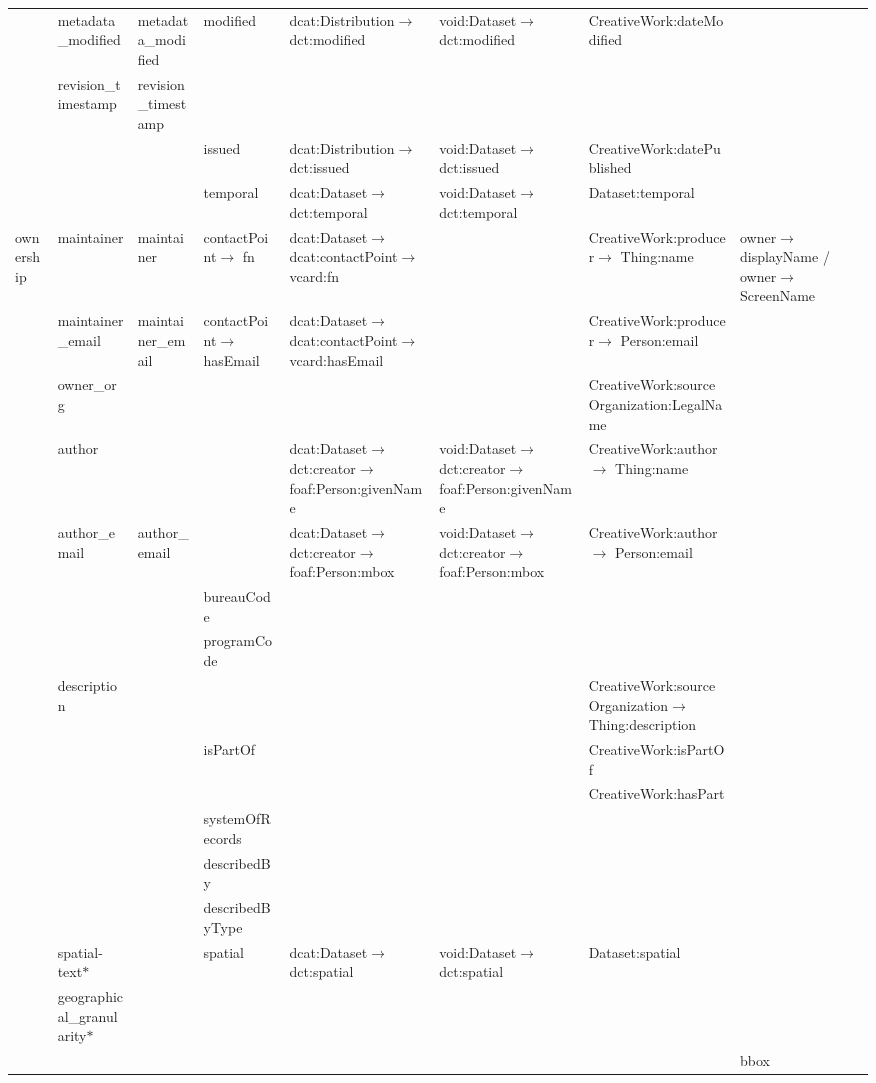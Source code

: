 \begin{landscape}
{\begin{longtable}{|p{1cm}|m{3.1cm}|m{2.4cm}|m{2.5cm}|p{3.8cm}|m{3.8cm}|m{5.55cm}|m{2.5cm}|}
\cline{2-8}
 & metadata\_modified & metadata\_modified & modified & dcat:Distribution$\rightarrow$ dct:modified & void:Dataset$\rightarrow$ dct:modified & CreativeWork:dateModified & \tabularnewline
\cline{2-8}
 & revision\_timestamp & revision\_timestamp &  &  &  &  & \tabularnewline
\cline{2-8}
 &  &  & issued & dcat:Distribution$\rightarrow$ dct:issued & void:Dataset$\rightarrow$ dct:issued & CreativeWork:datePublished & \tabularnewline
\cline{2-8}
 &  &  & temporal & dcat:Dataset$\rightarrow$ dct:temporal & void:Dataset$\rightarrow$ dct:temporal & Dataset:temporal & \tabularnewline
\hline
\multirow{14}{2cm}{ownership} & maintainer & maintainer & contactPoint$\rightarrow$ fn & dcat:Dataset$\rightarrow$ dcat:contactPoint$\rightarrow$ vcard:fn &  & CreativeWork:producer$\rightarrow$ Thing:name & owner$\rightarrow$ displayName / owner$\rightarrow$ ScreenName\tabularnewline
\cline{2-8}
 & maintainer\_email & maintainer\_email & contactPoint$\rightarrow$ hasEmail & dcat:Dataset$\rightarrow$ dcat:contactPoint$\rightarrow$ vcard:hasEmail &  & CreativeWork:producer$\rightarrow$ Person:email & \tabularnewline
\cline{2-8}
 & owner\_org &  &  &  &  & CreativeWork:sourceOrganization:LegalName & \tabularnewline
\cline{2-8}
 & author &  &  & dcat:Dataset$\rightarrow$ dct:creator$\rightarrow$ foaf:Person:givenName & void:Dataset$\rightarrow$ dct:creator$\rightarrow$ foaf:Person:givenName & CreativeWork:author$\rightarrow$ Thing:name & \tabularnewline
\cline{2-8}
 & author\_email & author\_email &  & dcat:Dataset$\rightarrow$ dct:creator$\rightarrow$ foaf:Person:mbox & void:Dataset$\rightarrow$ dct:creator$\rightarrow$ foaf:Person:mbox & CreativeWork:author$\rightarrow$ Person:email & \tabularnewline
\cline{2-8}
 &  &  & bureauCode &  &  &  & \tabularnewline
\cline{2-8}
 &  &  & programCode &  &  &  & \tabularnewline
\cline{2-8}
 & description &  &  &  &  & CreativeWork:sourceOrganization$\rightarrow$ Thing:description & \tabularnewline
\cline{2-8}
 &  &  & isPartOf &  &  & CreativeWork:isPartOf & \tabularnewline
\cline{2-8}
 &  &  &  &  &  & CreativeWork:hasPart & \tabularnewline
\cline{2-8}
 &  &  & systemOfRecords &  &  &  & \tabularnewline
\cline{2-8}
 &  &  & describedBy &  &  &  & \tabularnewline
\cline{2-8}
 &  &  & describedByType &  &  &  & \tabularnewline
\hline
\multirow{6}{2cm}{GeoSpatial} & spatial-text$\ast$ &  & spatial & dcat:Dataset$\rightarrow$ dct:spatial & void:Dataset$\rightarrow$ dct:spatial & Dataset:spatial & \tabularnewline
\cline{2-8}
 & geographical\_granularity$\ast$ &  &  &  &  &  & \tabularnewline
\cline{2-8}
 &  &  &  &  &  &  & bbox\tabularnewline

\end{longtable}}
\end{landscape}
